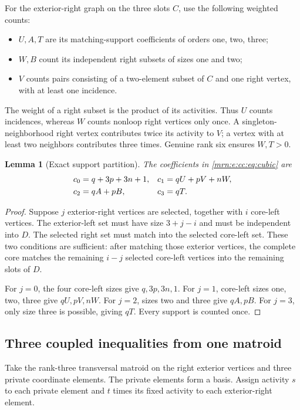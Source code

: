 \documentclass[11pt,a4paper]{article}
\newtheorem{lemma}[theorem]{Lemma}
\theoremstyle{remark}\newtheorem{remark}[theorem]{Remark}
\begin{document}
For the exterior-right graph on the three slots $C$, use the following weighted counts:
\begin{itemize}
 \item $U,A,T$ are its matching-support coefficients of orders one, two, three;
 \item $W,B$ count its independent right subsets of sizes one and two;
 \item $V$ counts pairs consisting of a two-element subset of $C$ and one right vertex, with at least one incidence.
\end{itemize}
The weight of a right subset is the product of its activities. Thus $U$ counts incidences, whereas $W$ counts nonloop right vertices only once. A singleton-neighborhood right vertex contributes twice its activity to $V$; a vertex with at least two neighbors contributes three times. Genuine rank six ensures $W,T>0$.

\begin{lemma}[Exact support partition]\label{mrn:e:cc:lem:counts}
The coefficients in \eqref{mrn:e:cc:eq:cubic} are
\begin{align}
 c_0&=q+3p+3n+1,&
 c_1&=qU+pV+nW,\label{mrn:e:cc:eq:counts}\\
 c_2&=qA+pB,&
 c_3&=qT.\notag
\end{align}
\end{lemma}
\begin{proof}
Suppose $j$ exterior-right vertices are selected, together with $i$ core-left vertices. The exterior-left set must have size $3+j-i$ and must be independent into $D$. The selected right set must match into the selected core-left set. These two conditions are sufficient: after matching those exterior vertices, the complete core matches the remaining $i-j$ selected core-left vertices into the remaining slots of $D$.

For $j=0$, the four core-left sizes give $q,3p,3n,1$. For $j=1$, core-left sizes one, two, three give $qU,pV,nW$. For $j=2$, sizes two and three give $qA,pB$. For $j=3$, only size three is possible, giving $qT$. Every support is counted once.
\end{proof}

\subsection{Three coupled inequalities from one matroid}
Take the rank-three transversal matroid on the right exterior vertices and three private coordinate elements. The private elements form a basis. Assign activity $s$ to each private element and $t$ times its fixed activity to each exterior-right element.
\end{document}
